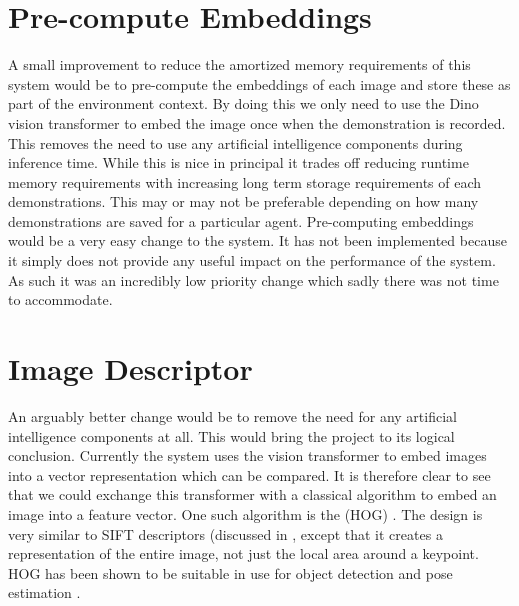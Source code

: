 \section{Pre-compute Embeddings}
A small improvement to reduce the amortized memory requirements of this system would be to pre-compute the embeddings of each image and store these as part of the environment context. By doing this we only need to use the Dino vision transformer to embed the image once when the demonstration is recorded. This removes the need to use any artificial intelligence components during inference time. While this is nice in principal it trades off reducing runtime memory requirements with increasing long term storage requirements of each demonstrations. This may or may not be preferable depending on how many demonstrations are saved for a particular agent. Pre-computing embeddings would be a very easy change to the system. It has not been implemented because it simply does not provide any useful impact on the performance of the system. As such it was an incredibly low priority change which sadly there was not time to accommodate.

\section{Image Descriptor}
An arguably better change would be to remove the need for any artificial intelligence components at all. This would bring the project to its logical conclusion. Currently the system uses the vision transformer to embed images into a vector representation which can be compared. It is therefore clear to see that we could exchange this transformer with a classical algorithm to embed an image into a feature vector. One such algorithm is the  (HOG) \cite{hog-patent}. The design is very similar to SIFT descriptors (discussed in , except that it creates a representation of the entire image, not just the local area around a keypoint. HOG has been shown to be suitable in use for object detection \cite{hog-object} and pose estimation \cite{hog-hand}.\\

